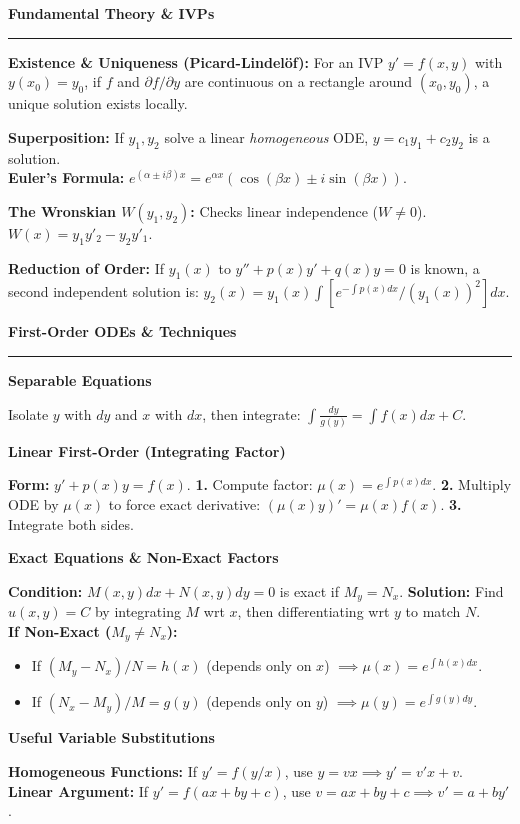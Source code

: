 \documentclass[10pt, landscape, twocolumn]{article}
\newcommand{\cheatsheetsection}[1]{
    \vspace{0.6em}
    {\color{themeblue}\large\bfseries #1} \par
    \vspace{-0.5em}
    {\color{themeblue}\rule{\linewidth}{1pt}} \par
    \vspace{0.2em}
}
\newcommand{\cheatsheetsubsection}[1]{
    \vspace{0.4em}
    {\color{themeblue}\normalsize\bfseries #1} \par
    \vspace{0.1em}
}
\begin{document}
\cheatsheetsection{Fundamental Theory \& IVPs}

\textbf{Existence \& Uniqueness (Picard-Lindelöf):} For an IVP $y' = f(x,y)$ with $y(x_0) = y_0$, if $f$ and $\partial f/\partial y$ are continuous on a rectangle around $(x_0, y_0)$, a unique solution exists locally.

\textbf{Superposition:} If $y_1, y_2$ solve a linear \textit{homogeneous} ODE, $y = c_1y_1 + c_2y_2$ is a solution. \\
\textbf{Euler's Formula:} $e^{(\alpha \pm i\beta)x} = e^{\alpha x}(\cos(\beta x) \pm i\sin(\beta x))$.

\textbf{The Wronskian $W(y_1, y_2)$:} Checks linear independence ($W \neq 0$). $W(x) = y_1 y'_2 - y_2 y'_1$.

\textbf{Reduction of Order:} If $y_1(x)$ to $y'' + p(x)y' + q(x)y = 0$ is known, a second independent solution is: $y_2(x) = y_1(x) \int [e^{-\int p(x)dx} / (y_1(x))^2] dx$.

\cheatsheetsection{First-Order ODEs \& Techniques}

\cheatsheetsubsection{Separable Equations}
Isolate $y$ with $dy$ and $x$ with $dx$, then integrate: $\int \frac{dy}{g(y)} = \int f(x)dx + C$.

\cheatsheetsubsection{Linear First-Order (Integrating Factor)}
\textbf{Form:} $y' + p(x)y = f(x)$. \textbf{1.} Compute factor: $\mu(x) = e^{\int p(x)dx}$. \textbf{2.} Multiply ODE by $\mu(x)$ to force exact derivative: $(\mu(x)y)' = \mu(x)f(x)$. \textbf{3.} Integrate both sides.

\cheatsheetsubsection{Exact Equations \& Non-Exact Factors}
\textbf{Condition:} $M(x,y)dx + N(x,y)dy = 0$ is exact if $M_y = N_x$. \textbf{Solution:} Find $u(x,y) = C$ by integrating $M$ wrt $x$, then differentiating wrt $y$ to match $N$. \\
\textbf{If Non-Exact ($M_y \neq N_x$):}
\begin{itemize}[leftmargin=*, nosep]
    \item If $(M_y - N_x)/N = h(x)$ (depends only on $x$) $\implies \mu(x) = e^{\int h(x)dx}$.
    \item If $(N_x - M_y)/M = g(y)$ (depends only on $y$) $\implies \mu(y) = e^{\int g(y)dy}$.
\end{itemize}

\cheatsheetsubsection{Useful Variable Substitutions}
\textbf{Homogeneous Functions:} If $y' = f(y/x)$, use $y = vx \implies y' = v'x + v$. \\
\textbf{Linear Argument:} If $y' = f(ax+by+c)$, use $v = ax+by+c \implies v' = a + by'$.
\end{document}
